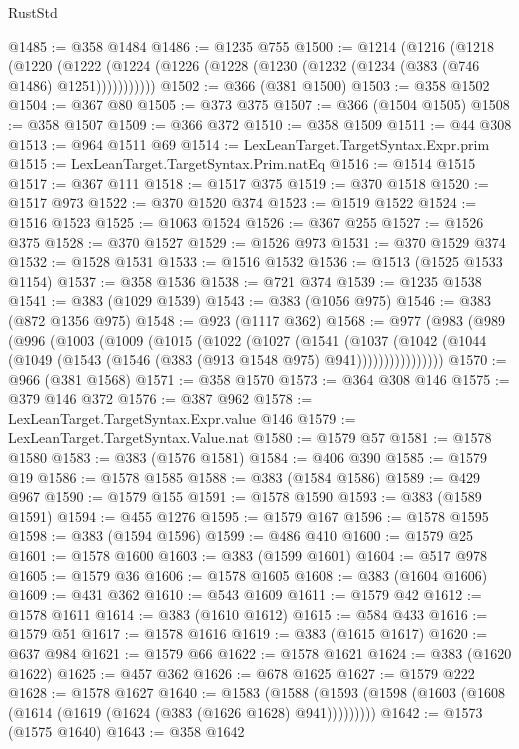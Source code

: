 \begin{lexlean}{RustStd}
\begin{coremodule}
@1485 := @358 @1484
@1486 := @1235 @755
@1500 := @1214
    (@1216
      (@1218
        (@1220 (@1222 (@1224 (@1226 (@1228 (@1230 (@1232 (@1234 (@383 (@746 @1486) @1251)))))))))))
@1502 := @366 (@381 @1500)
@1503 := @358 @1502
@1504 := @367 @80
@1505 := @373 @375
@1507 := @366 (@1504 @1505)
@1508 := @358 @1507
@1509 := @366 @372
@1510 := @358 @1509
@1511 := @44 @308
@1513 := @964 @1511 @69
@1514 := LexLeanTarget.TargetSyntax.Expr.prim
@1515 := LexLeanTarget.TargetSyntax.Prim.natEq
@1516 := @1514 @1515
@1517 := @367 @111
@1518 := @1517 @375
@1519 := @370 @1518
@1520 := @1517 @973
@1522 := @370 @1520 @374
@1523 := @1519 @1522
@1524 := @1516 @1523
@1525 := @1063 @1524
@1526 := @367 @255
@1527 := @1526 @375
@1528 := @370 @1527
@1529 := @1526 @973
@1531 := @370 @1529 @374
@1532 := @1528 @1531
@1533 := @1516 @1532
@1536 := @1513 (@1525 @1533 @1154)
@1537 := @358 @1536
@1538 := @721 @374
@1539 := @1235 @1538
@1541 := @383 (@1029 @1539)
@1543 := @383 (@1056 @975)
@1546 := @383 (@872 @1356 @975)
@1548 := @923 (@1117 @362)
@1568 := @977
    (@983
      (@989
        (@996
          (@1003
            (@1009
              (@1015
                (@1022
                  (@1027
                    (@1541
                      (@1037
                        (@1042
                          (@1044 (@1049 (@1543 (@1546 (@383 (@913 @1548 @975) @941))))))))))))))))
@1570 := @966 (@381 @1568)
@1571 := @358 @1570
@1573 := @364 @308 @146
@1575 := @379 @146 @372
@1576 := @387 @962
@1578 := LexLeanTarget.TargetSyntax.Expr.value @146
@1579 := LexLeanTarget.TargetSyntax.Value.nat
@1580 := @1579 @57
@1581 := @1578 @1580
@1583 := @383 (@1576 @1581)
@1584 := @406 @390
@1585 := @1579 @19
@1586 := @1578 @1585
@1588 := @383 (@1584 @1586)
@1589 := @429 @967
@1590 := @1579 @155
@1591 := @1578 @1590
@1593 := @383 (@1589 @1591)
@1594 := @455 @1276
@1595 := @1579 @167
@1596 := @1578 @1595
@1598 := @383 (@1594 @1596)
@1599 := @486 @410
@1600 := @1579 @25
@1601 := @1578 @1600
@1603 := @383 (@1599 @1601)
@1604 := @517 @978
@1605 := @1579 @36
@1606 := @1578 @1605
@1608 := @383 (@1604 @1606)
@1609 := @431 @362
@1610 := @543 @1609
@1611 := @1579 @42
@1612 := @1578 @1611
@1614 := @383 (@1610 @1612)
@1615 := @584 @433
@1616 := @1579 @51
@1617 := @1578 @1616
@1619 := @383 (@1615 @1617)
@1620 := @637 @984
@1621 := @1579 @66
@1622 := @1578 @1621
@1624 := @383 (@1620 @1622)
@1625 := @457 @362
@1626 := @678 @1625
@1627 := @1579 @222
@1628 := @1578 @1627
@1640 := @1583
    (@1588 (@1593 (@1598 (@1603 (@1608 (@1614 (@1619 (@1624 (@383 (@1626 @1628) @941)))))))))
@1642 := @1573 (@1575 @1640)
@1643 := @358 @1642

\end{coremodule}
\end{lexlean}
